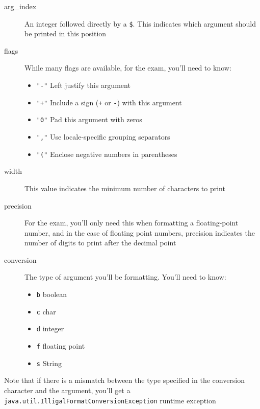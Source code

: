 \begin{description}
    \item[arg\_index] An integer followed directly by a \verb#$#. This 
    indicates which argument should be printed in this position
    \item[flags] While many flags are available, for the exam, you'll need to 
    know:
        \begin{itemize}
            \item \verb#"-"# Left justify this argument
            \item \verb#"+"# Include a sign (\verb#+# or \verb#-#) with this 
            argument
            \item \verb#"0"# Pad this argument with zeros
            \item \verb#","# Use locale-specific grouping separators
            \item \verb#"("# Enclose negative numbers in 
            parentheses
        \end{itemize}
    \item[width] This value indicates the minimum number of characters to print
    \item[precision] For the exam, you'll only need this when formatting a 
    floating-point number, and in the case of floating point numbers, precision 
    indicates the number of digits to print after the decimal point
    \item[conversion] The type of argument you'll be formatting. You'll need to 
    know:
        \begin{itemize}
            \item \verb#b# boolean
            \item \verb#c# char
            \item \verb#d# integer
            \item \verb#f# floating point
            \item \verb#s# String
        \end{itemize}
\end{description}
Note that if there is a mismatch between the type specified in the conversion 
character and the argument, you'll get a 
\verb#java.util.IlligalFormatConversionException# runtime exception
